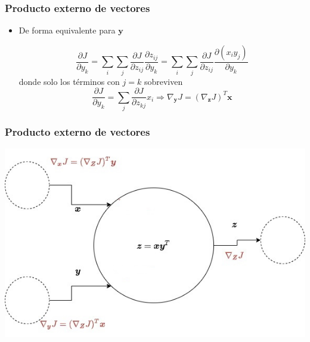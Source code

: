 \documentclass{beamer}
\begin{document}
\begin{frame}
\frametitle{Producto externo de vectores}
\begin{itemize}
\item De forma equivalente para $\boldsymbol{y} $

\begin{equation*}
\frac{\partial J}{\partial y_k}=\sum_i\sum_j \frac{\partial J}{\partial z_{ij}}\frac{\partial z_{ij}}{\partial y_k}= \sum_i\sum_j \frac{\partial J}{\partial z_{ij}} \frac{\partial {(x_iy_j)}}{\partial y_k}
\end{equation*}
donde solo los términos con $j=k$ sobreviven 
\begin{equation*}
\frac{\partial J}{\partial y_k}=\sum_j\frac{\partial J}{\partial z_{kj}}x_i \Rightarrow \nabla_{\boldsymbol{y}}J=(\nabla_{\boldsymbol{z}} J)^T \boldsymbol{x}
\end{equation*}
\end{itemize}
\end{frame}
\begin{frame}
\frametitle{Producto externo de vectores}
\includegraphics[scale=0.35]{im28}
\end{frame}
\end{document}

